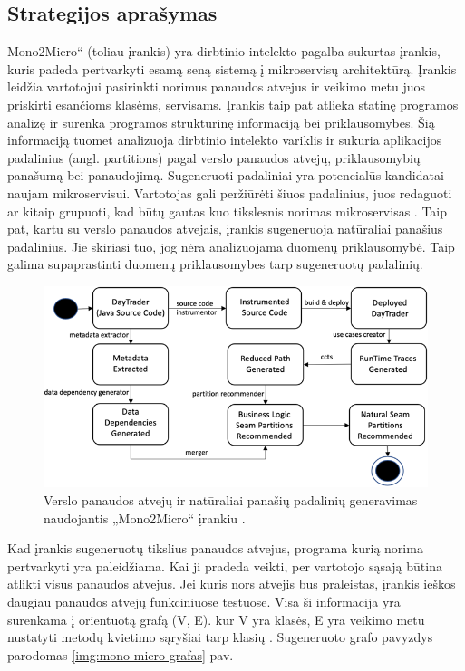\documentclass[fleqn]{VUMIFPSkursinis}
\begin{document}
\subsection{Strategijos aprašymas}
Mono2Micro“ (toliau įrankis) yra dirbtinio intelekto pagalba sukurtas įrankis, kuris padeda pertvarkyti esamą seną sistemą į mikroservisų architektūrą. Įrankis leidžia vartotojui pasirinkti norimus panaudos atvejus ir veikimo metu juos priskirti esančioms klasėms, servisams. Įrankis taip pat atlieka statinę programos analizę ir surenka programos struktūrinę informaciją bei priklausomybes. Šią informaciją tuomet analizuoja dirbtinio intelekto variklis ir sukuria aplikacijos padalinius (angl. partitions) pagal verslo panaudos atvejų, priklausomybių panašumą bei panaudojimą. Sugeneruoti padaliniai yra potencialūs kandidatai naujam mikroservisui. Vartotojas gali peržiūrėti šiuos padalinius, juos redaguoti ar kitaip grupuoti, kad būtų gautas kuo tikslesnis norimas mikroservisas \cite{KXK+21}. Taip pat, kartu su verslo panaudos atvejais, įrankis sugeneruoja natūraliai panašius padalinius. Jie skiriasi tuo, jog nėra analizuojama duomenų priklausomybė. Taip galima supaprastinti duomenų priklausomybes tarp sugeneruotų padalinių.

\begin{figure}[H]
    \centering
    \includegraphics{img/mono-2-micro-veikimas.png}
    \caption{Verslo panaudos atvejų ir natūraliai panašių padalinių generavimas naudojantis „Mono2Micro“ įrankiu \cite{KXL+20}.}
    \label{img:mono-2-micro}
\end{figure}

Kad įrankis sugeneruotų tikslius panaudos atvejus, programa kurią norima pertvarkyti yra paleidžiama. Kai ji pradeda veikti, per vartotojo sąsają būtina atlikti visus panaudos atvejus. Jei kuris nors atvejis bus praleistas, įrankis ieškos daugiau panaudos atvejų funkciniuose testuose. Visa ši informacija yra surenkama į orientuotą grafą (V, E). kur V yra klasės, E yra veikimo metu nustatyti metodų kvietimo sąryšiai tarp klasių \cite{KXL+20}. Sugeneruoto grafo pavyzdys parodomas \ref{img:mono-micro-grafas} pav.
\end{document}
